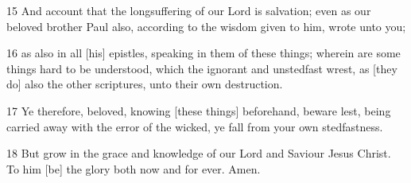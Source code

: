 \par 15 And account that the longsuffering of our Lord is salvation; even as our beloved brother Paul also, according to the wisdom given to him, wrote unto you;
\par 16 as also in all [his] epistles, speaking in them of these things; wherein are some things hard to be understood, which the ignorant and unstedfast wrest, as [they do] also the other scriptures, unto their own destruction.
\par 17 Ye therefore, beloved, knowing [these things] beforehand, beware lest, being carried away with the error of the wicked, ye fall from your own stedfastness.
\par 18 But grow in the grace and knowledge of our Lord and Saviour Jesus Christ. To him [be] the glory both now and for ever. Amen.

